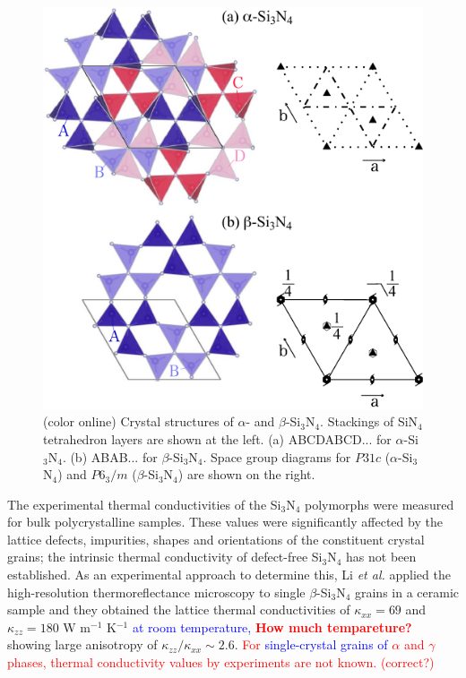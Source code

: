 \documentclass[twocolumn,amsmath,amssymb,a4paper,prb,superscriptaddress,floatfix]{revtex4-1}
\begin{document}
\begin{figure}[ht]
 \begin{center}
  \includegraphics[width=0.90\linewidth]{Fig1_crystal_str2.pdf}
  \caption{(color online) Crystal structures of $\alpha$- and
  $\beta$-Si$_3$N$_4$. Stackings of SiN$_4$ tetrahedron layers are shown
  at the left. (a) ABCDABCD... for $\alpha$-Si$_3$N$_4$. (b) ABAB... for
  $\beta$-Si$_3$N$_4$.  Space group diagrams\cite{inttableA} for
  $P31c$ ($\alpha$-Si$_3$N$_4$) and $P6_3/m$
  ($\beta$-Si$_3$N$_4$) are shown on the right.}  \label{fig:Fig1_cryst}
 \end{center}
\end{figure}

The experimental thermal conductivities
\cite{zhou,hirao-rev,watari,hirosaki,hirai} of the Si$_3$N$_4$
polymorphs were measured for bulk polycrystalline samples. These values
were significantly affected by the lattice defects, impurities, shapes
and orientations of the constituent crystal grains;\cite{hirosaki-md}
the intrinsic thermal conductivity of defect-free Si$_3$N$_4$ has not
been established. As an experimental approach to determine this, Li {\it
et al.}\cite{li} applied the high-resolution thermoreflectance
microscopy to single $\beta$-Si$_3$N$_4$ grains in a ceramic sample and
they obtained the lattice thermal conductivities of $\kappa_{xx}=69$ and
$\kappa_{zz}=180$ W m$^{-1}$ K$^{-1}$ \textcolor{blue}{at room temperature, }\textcolor{red}{\textbf{How much
tempareture?}} showing large anisotropy of $\kappa_{zz}/\kappa_{xx} \sim
2.6$. \textcolor{red}{For \textcolor{blue}{single-crystal grains of} $\alpha$ and $\gamma$ phases, thermal
conductivity values by experiments are not known. (correct?)}
\end{document}
